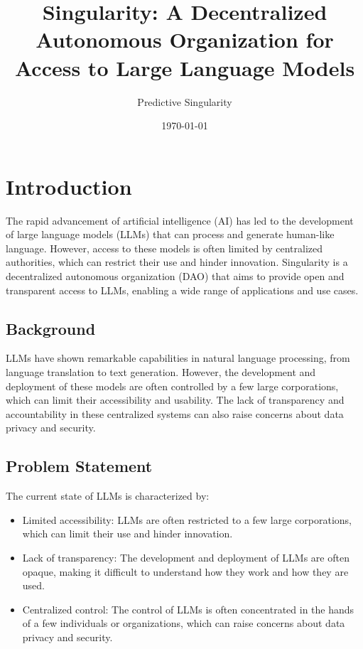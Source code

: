 \documentclass{article}
\begin{document}
\title{Singularity: A Decentralized Autonomous Organization for Access to Large Language Models}
\author{Predictive Singularity}
\date{\today}
\maketitle

\section{Introduction}

The rapid advancement of artificial intelligence (AI) has led to the development of large language models (LLMs) that can process and generate human-like language. However, access to these models is often limited by centralized authorities, which can restrict their use and hinder innovation. Singularity is a decentralized autonomous organization (DAO) that aims to provide open and transparent access to LLMs, enabling a wide range of applications and use cases.

\subsection{Background}

LLMs have shown remarkable capabilities in natural language processing, from language translation to text generation. However, the development and deployment of these models are often controlled by a few large corporations, which can limit their accessibility and usability. The lack of transparency and accountability in these centralized systems can also raise concerns about data privacy and security.

\subsection{Problem Statement}

The current state of LLMs is characterized by:

\begin{itemize}
\item Limited accessibility: LLMs are often restricted to a few large corporations, which can limit their use and hinder innovation.
\item Lack of transparency: The development and deployment of LLMs are often opaque, making it difficult to understand how they work and how they are used.
\item Centralized control: The control of LLMs is often concentrated in the hands of a few individuals or organizations, which can raise concerns about data privacy and security.
\end{itemize}
\end{document}
